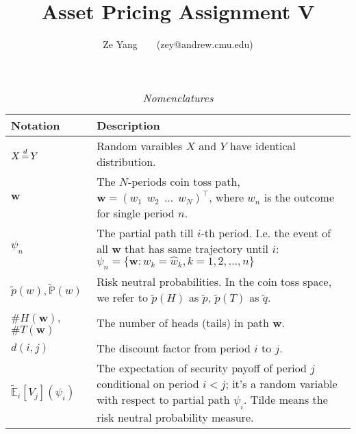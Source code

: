 \documentclass[a4paper, 10pt]{article}
\title{\textbf{Asset Pricing Assignment V}}
\author{Ze Yang~~~~(zey@andrew.cmu.edu)}
\renewcommand{\arraystretch}{1.4}
\theoremstyle{definition}
\theoremstyle{hSol}
\begin{document}
\maketitle

\begin{table}[h]
\vspace{-10pt}
\caption{\textit{Nomenclatures}}
\vspace{3pt}
\centering
\def\arraystretch{1.15}
\begin{tabular}{lL}
\hline
Notation & \hspace{4.6cm} Description \\ 
\hline
$X\,{\buildrel d \over =}\,Y$ & Random varaibles $X$ and $Y$ have identical distribution.\\
$\bm{w}$ & The $N$-periods coin toss path, $\bm{w} = (w_1~~w_2~~...~~w_N)^{\top}$, where $w_n$ is the outcome for single period $n$.\\
$\psi_n$ & The partial path till $i$-th period. I.e. the event of all $\bm{w}$ that has same trajectory until $i$: $\psi_n=\{\bm{w}: w_k=\hat{w}_k, k =1,2,...,n\}$\\
$\tilde{p}(w), \tilde{\mathbb{P}}\left(w\right)$ & Risk neutral probabilities. In the coin toss space, we refer to $\tilde{p}(H)$ as $\tilde{p}$, $\tilde{p}(T)$ as $\tilde{q}$.\\
$\#H(\bm{w})$, $\#T(\bm{w})$ & The number of heads (tails) in path $\bm{w}$. \\
$d(i, j)$ & The discount factor from period $i$ to $j$. \\
$\tilde{\mathbb{E}}_i\left[V_{j}\right](\psi_i)$ & The expectation of security payoff of period $j$ conditional on period $i<j$; it's a random variable with respect to partial path $\psi_i$. Tilde means the risk neutral probability measure.\\
\hline 
\end{tabular}
\label{tab:Nomen}
\end{table}
\end{document}
